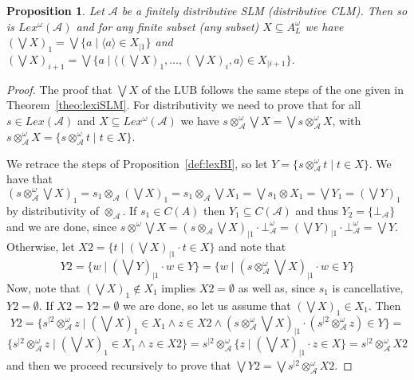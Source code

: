 \documentclass[a4paper]{elsarticle}
\newtheorem{proposition}{Proposition}
\newcommand{\1}{\mathbf{1}}
\begin{document}
\begin{proposition}\label{prop:lexiSLM}
	Let $\mathcal{A}$ be a finitely distributive SLM (distributive CLM).
	Then so is $Lex^\omega(\mathcal{A})$
	and for any finite subset (any subset) $X \subseteq A^\omega_L$ 
         we have $(\bigvee X)_1 = \bigvee \{ a \mid \langle a \rangle \in X_{\mid 1}\}$
         and $(\bigvee X)_{i+1} = \bigvee \{ a \mid \langle (\bigvee X)_1, \ldots, (\bigvee X)_i, a \rangle \in X_{\mid i+1}\}$.
\end{proposition}
\begin{proof}
	The proof that $\bigvee X$ of the LUB follows the same steps of the one given in Theorem~\ref{theo:lexiSLM}.
	For distributivity we need to prove that for all $s \in Lex(\mathcal{A})$ and 
	$X \subseteq Lex^\omega(\mathcal{A})$ we have $s \otimes^\omega_\mathcal{A} \bigvee X = \bigvee s \otimes^\omega_\mathcal{A} X$, 
	with $s \otimes^\omega_\mathcal{A} X = \{ s \otimes^\omega_\mathcal{A} t \mid t \in X\}$.
	
	We retrace the steps of Proposition~\ref{def:lexBI}, so let $Y = \{ s \otimes^\omega_\mathcal{A} t \mid t \in X\}$.
	We have that 
	$(s \otimes^\omega_\mathcal{A} \bigvee X)_1 = s_1 \otimes_\mathcal{A} (\bigvee X)_1 = s_1 \otimes_\mathcal{A} \bigvee X_1
	= \bigvee s_1 \otimes X_1 =  \bigvee Y_1 = (\bigvee Y)_1$
	by distributivity of $\otimes_\mathcal{A}$.
	If $s_1 \in C(A)$ then $Y_1 \subseteq C(\mathcal{A})$ and thus $Y_2 = \{\bot_\mathcal{A}\}$ and we are done, since 
	$s \otimes^\omega \bigvee X = (s \otimes_\mathcal{A} \bigvee X)_{\mid 1} \cdot \bot^\omega_\mathcal{A}
	= (\bigvee Y)_{\mid 1} \cdot  \bot^\omega_\mathcal{A}  = \bigvee Y$.
	Otherwise, 
	let $X2 = \{ t \mid (\bigvee X)_{\mid 1} \cdot t \in X\}$ and note that 
	$$Y2 = \{ w \mid (\bigvee Y)_{\mid 1} \cdot w \in Y\}
	= \{ w \mid (s \otimes^\omega_\mathcal{A} \bigvee X)_{\mid 1} \cdot w \in Y \}$$
	\noindent
	Now, note that $(\bigvee X)_1 \not \in X_1$ implies $X2 = \emptyset$ as well as, since $s_1$ is cancellative, $Y2 = \emptyset$.
	If $X2 = Y2 = \emptyset$ we are done, so let us assume that $(\bigvee X)_1 \in X_1$. Then
	$$Y2 = \{ s^{\mid 2} \otimes^\omega_\mathcal{A}  z \mid (\bigvee X)_1 \in X_1 \wedge z \in X2 \wedge 
	       (s \otimes^\omega_\mathcal{A} \bigvee X)_{\mid 1} \cdot (s^{\mid 2} \otimes^\omega_\mathcal{A}  z) \in Y \} =$$
	$$\{ s^{\mid 2} \otimes^\omega_\mathcal{A} z \mid  (\bigvee X)_1 \in X_1 \wedge z \in X2\} =
	    s^{\mid 2} \otimes^\omega_\mathcal{A} \{ z \mid (\bigvee X)_{\mid 1} \cdot z \in X \} = s^{\mid 2} \otimes^\omega_\mathcal{A} X2$$
	\noindent
	and then we proceed recursively to prove that $\bigvee Y2 = \bigvee s^{\mid 2} \otimes^\omega_\mathcal{A} X2$.
\end{proof}
\end{document}
